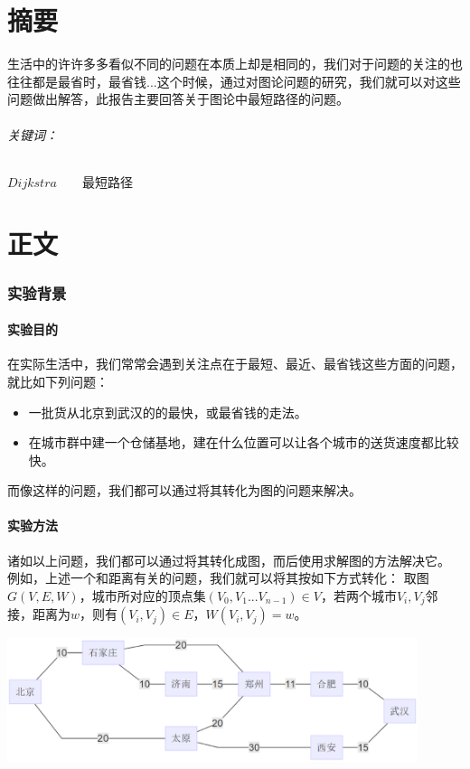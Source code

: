 \documentclass[a4paper,10pt]{ctexart}
\begin{document}
\part*{摘要}
生活中的许许多多看似不同的问题在本质上却是相同的，我们对于问题的关注的也往往都是最省时，最省钱...这个时候，通过对图论问题的研究，我们就可以对这些问题做出解答，此报告主要回答关于图论中最短路径的问题。
\\ \paragraph{关键词：}$Dijkstra$\ \ \ \ 最短路径
\tableofcontents

\newpage
\part{正文}
\section{实验背景}

\subsection{实验目的}
在实际生活中，我们常常会遇到关注点在于最短、最近、最省钱这些方面的问题，就比如下列问题：
\begin{itemize}
\item 一批货从北京到武汉的的最快，或最省钱的走法。
\item 在城市群中建一个仓储基地，建在什么位置可以让各个城市的送货速度都比较快。
\end{itemize}
而像这样的问题，我们都可以通过将其转化为图的问题来解决。

\subsection{实验方法}
诸如以上问题，我们都可以通过将其转化成图，而后使用求解图的方法解决它。
例如，上述一个和距离有关的问题，我们就可以将其按如下方式转化：
取图$G(V,E,W)$，城市所对应的顶点集$(V_0,V_1...V_{n-1}) \in V $，若两个城市$V_i,V_j$邻接，距离为$w$，则有$(V_i,V_j)\in E$，$W(V_i,V_j)=w$。

\includegraphics[width=0.9\textwidth]{../Pics/MiniLen.eps}
\end{document}
